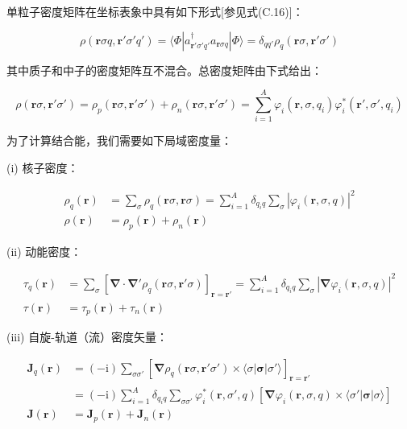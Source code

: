 单粒子密度矩阵在坐标表象中具有如下形式{[}参见式(C.16){]}：

\begin{equation}
\rho(\boldsymbol{r}\sigma q,\boldsymbol{r}'\sigma'q')=\langle\Phi|a^{\dagger}_{\boldsymbol{r}'\sigma'q'}a_{\boldsymbol{r}\sigma q}|\Phi\rangle=\delta_{qq'}\rho_{q}(\boldsymbol{r}\sigma,\boldsymbol{r}'\sigma')\label{eq:density_matrix_coord}
\end{equation}

其中质子和中子的密度矩阵互不混合。总密度矩阵由下式给出：

\begin{equation}
\rho(\boldsymbol{r}\sigma,\boldsymbol{r}'\sigma')=\rho_{p}(\boldsymbol{r}\sigma,\boldsymbol{r}'\sigma')+\rho_{n}(\boldsymbol{r}\sigma,\boldsymbol{r}'\sigma')=\sum^{A}_{i=1}\varphi_{i}(\boldsymbol{r},\sigma,q_{i})\varphi^{*}_{i}(\boldsymbol{r}',\sigma',q_{i})\label{eq:total_density_matrix}
\end{equation}

为了计算结合能，我们需要如下局域密度量\cite{VB72}：

(i) 核子密度：

\begin{align}
\rho_{q}(\boldsymbol{r}) & =\sum_{\sigma}\rho_{q}(\boldsymbol{r}\sigma,\boldsymbol{r}\sigma)=\sum^{A}_{i=1}\delta_{q_{i}q}\sum_{\sigma}|\varphi_{i}(\boldsymbol{r},\sigma,q)|^{2}\label{eq:rho_q_def}\\
\rho(\boldsymbol{r}) & =\rho_{p}(\boldsymbol{r})+\rho_{n}(\boldsymbol{r})\label{eq:rho_tot_def}
\end{align}

(ii) 动能密度：

\begin{align}
\tau_{q}(\boldsymbol{r}) & =\sum_{\sigma}\left[\boldsymbol{\nabla}\cdot\boldsymbol{\nabla}'\rho_{q}(\boldsymbol{r}\sigma,\boldsymbol{r}'\sigma)\right]_{\boldsymbol{r}=\boldsymbol{r}'}=\sum^{A}_{i=1}\delta_{q_{i}q}\sum_{\sigma}|\boldsymbol{\nabla}\varphi_{i}(\boldsymbol{r},\sigma,q)|^{2}\label{eq:tau_q_def}\\
\tau(\boldsymbol{r}) & =\tau_{p}(\boldsymbol{r})+\tau_{n}(\boldsymbol{r})\label{eq:tau_tot_def}
\end{align}

(iii) 自旋-轨道（流）密度矢量：

\begin{align}
\boldsymbol{J}_{q}(\boldsymbol{r}) & =(-\mathrm{i})\sum_{\sigma\sigma'}\left[\boldsymbol{\nabla}\rho_{q}(\boldsymbol{r}\sigma,\boldsymbol{r}'\sigma')\times\langle\sigma|\boldsymbol{\sigma}|\sigma'\rangle\right]_{\boldsymbol{r}=\boldsymbol{r}'}\nonumber \\
 & =(-\mathrm{i})\sum^{A}_{i=1}\delta_{q_{i}q}\sum_{\sigma\sigma'}\varphi^{*}_{i}(\boldsymbol{r},\sigma',q)\left[\boldsymbol{\nabla}\varphi_{i}(\boldsymbol{r},\sigma,q)\times\langle\sigma'|\boldsymbol{\sigma}|\sigma\rangle\right]\label{eq:J_q_def}\\
\boldsymbol{J}(\boldsymbol{r}) & =\boldsymbol{J}_{p}(\boldsymbol{r})+\boldsymbol{J}_{n}(\boldsymbol{r})\label{eq:J_tot_def}
\end{align}

